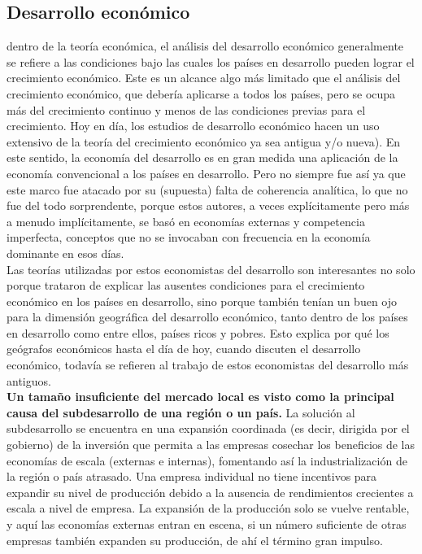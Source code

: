 \subsection{Desarrollo económico}
dentro de la teoría económica, el análisis del desarrollo económico generalmente se refiere a las condiciones bajo las cuales los países en desarrollo pueden lograr el crecimiento económico. Este es un alcance algo más limitado que el análisis del crecimiento económico, que debería aplicarse a todos los países, pero se ocupa más del crecimiento continuo y menos de las condiciones previas para el crecimiento. Hoy en día, los estudios de desarrollo económico hacen un uso extensivo de la teoría del crecimiento económico ya sea antigua y/o nueva). En este sentido, la economía del desarrollo es en gran medida una aplicación de la economía convencional a los países en desarrollo. Pero no siempre fue así ya que este marco fue atacado por su (supuesta) falta de coherencia analítica, lo que no fue del todo sorprendente, porque estos autores, a veces explícitamente pero más a menudo implícitamente, se basó en economías externas y competencia imperfecta, conceptos que no se invocaban con frecuencia en la economía dominante en esos días. \\
Las teorías utilizadas por estos economistas del desarrollo son interesantes no solo porque trataron de explicar las ausentes condiciones para el crecimiento económico en los países en desarrollo, sino porque también tenían un buen ojo para la dimensión geográfica del desarrollo económico, tanto dentro de los países en desarrollo como entre ellos, países ricos y pobres. Esto explica por qué los geógrafos económicos hasta el día de hoy, cuando discuten el desarrollo económico, todavía se refieren al trabajo de estos economistas del desarrollo más antiguos.\\
\textbf{Un tamaño insuficiente del mercado local es visto como la principal causa del subdesarrollo de una región o un país.} La solución al subdesarrollo se encuentra en una expansión coordinada (es decir, dirigida por el gobierno) de la inversión que permita a las empresas cosechar los beneficios de las economías de escala (externas e internas), fomentando así la industrialización de la región o país atrasado. Una empresa individual no tiene incentivos para expandir su nivel de producción debido a la ausencia de rendimientos crecientes a escala a nivel de empresa. La expansión de la producción solo se vuelve rentable, y aquí las economías externas entran en escena, si un número suficiente de otras empresas también expanden su producción, de ahí el término gran impulso.\\
